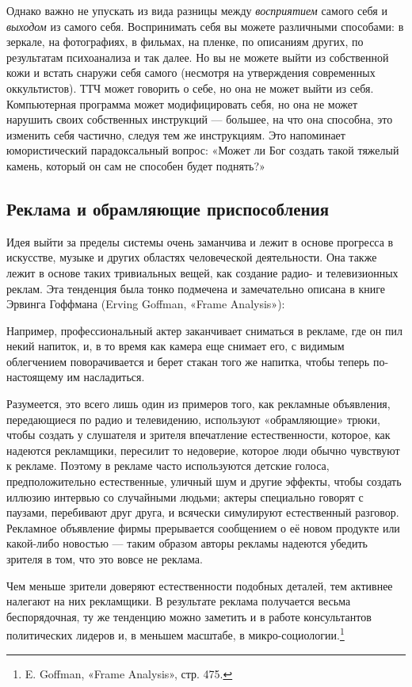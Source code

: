 \documentclass[../main.tex]{subfiles}
\begin{document}
Однако важно не упускать из вида разницы между \emph{восприятием} самого себя и \emph{выходом} из самого себя. Воспринимать себя вы можете различными способами: в зеркале, на фотографиях, в фильмах, на пленке, по описаниям других, по результатам психоанализа и так далее. Но вы не можете выйти из собственной кожи и встать снаружи себя самого (несмотря на утверждения современных оккультистов). ТТЧ может говорить о себе, но она не может выйти из себя. Компьютерная программа может модифицировать себя, но она не может нарушить своих собственных инструкций --- большее, на что она способна, это изменить себя частично, следуя тем же инструкциям. Это напоминает юмористический парадоксальный вопрос: «Может ли Бог создать такой тяжелый камень, который он сам не способен будет поднять?»


\subsection{Реклама и обрамляющие приспособления}

Идея выйти за пределы системы очень заманчива и лежит в основе прогресса в искусстве, музыке и других областях человеческой деятельности. Она также лежит в основе таких тривиальных вещей, как создание радио- и телевизионных реклам. Эта тенденция была тонко подмечена и замечательно описана в книге Эрвинга Гоффмана (Erving Goffman, «Frame Analysis»):

Например, профессиональный актер заканчивает сниматься в рекламе, где он пил некий напиток, и, в то время как камера еще снимает его, с видимым облегчением поворачивается и берет стакан того же напитка, чтобы теперь по-настоящему им насладиться.

Разумеется, это всего лишь один из примеров того, как рекламные объявления, передающиеся по радио и телевидению, используют «обрамляющие» трюки, чтобы создать у слушателя и зрителя впечатление естественности, которое, как надеются рекламщики, пересилит то недоверие, которое люди обычно чувствуют к рекламе. Поэтому в рекламе часто используются детские голоса, предположительно естественные, уличный шум и другие эффекты, чтобы создать иллюзию интервью со случайными людьми; актеры специально говорят с паузами, перебивают друг друга, и всячески симулируют естественный разговор. Рекламное объявление фирмы прерывается сообщением о её новом продукте или какой-либо новостью --- таким образом авторы рекламы надеются убедить зрителя в том, что это вовсе не реклама.

Чем меньше зрители доверяют естественности подобных деталей, тем активнее налегают на них рекламщики. В результате реклама получается весьма беспорядочная, ту же тенденцию можно заметить и в работе консультантов политических лидеров и, в меньшем масштабе, в микро-социологии.\footnote{E. Goffman, «Frame Analysis», стр. 475.}
\end{document}
